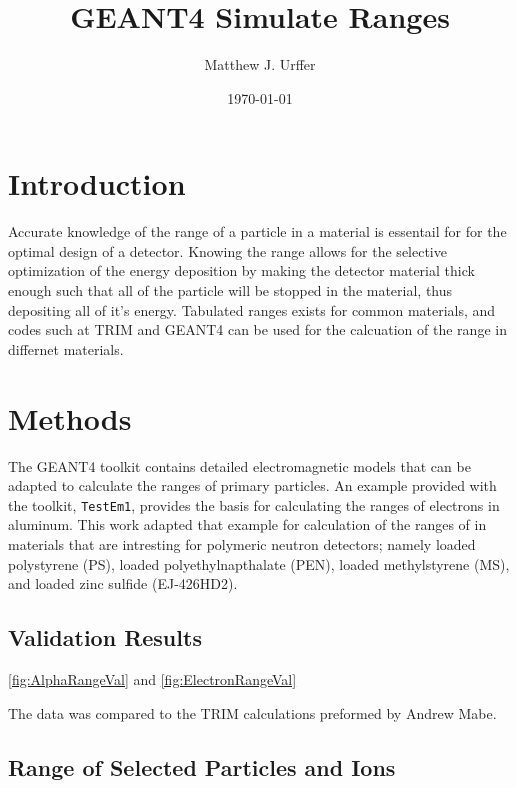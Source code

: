 \documentclass[draftcls,onecolumn]{IEEEtran}
\begin{document}
\title{GEANT4 Simulate Ranges}
\author{Matthew J. Urffer}
\date{\today}
\maketitle

\printnomenclature

\listoftodos
\tableofcontents
\listoffigures
\listoftables
\lstlistoflistings

\section{Introduction}
Accurate knowledge of the range of a particle in a material is essentail for for the optimal design of a detector.
Knowing the range allows for the selective optimization of the energy deposition by making the detector material thick enough such that all of the particle will be stopped in the material, thus depositing all of it's energy.
Tabulated ranges exists for common materials, and codes such at TRIM and GEANT4 can be used for the calcuation of the range in differnet materials\cite{berger_estar_2005}.

\section{Methods}
The GEANT4 toolkit contains detailed electromagnetic models that can be adapted to calculate the ranges of primary particles.
An example provided with the toolkit, \verb+TestEm1+, provides the basis for calculating the ranges of electrons in aluminum. 
This work adapted that example for calculation of the ranges of in materials that are intresting for polymeric neutron detectors; namely  loaded polystyrene (PS),  loaded polyethylnapthalate (PEN),  loaded methylstyrene (MS), and  loaded zinc sulfide (EJ-426HD2).


\subsection{Validation Results}
\label{sec:ValResults}
\autoref{fig:AlphaRangeVal} and \autoref{fig:ElectronRangeVal}

The data was compared to the TRIM calculations preformed by Andrew Mabe.
\subsection{Range of Selected Particles and Ions}
\label{sec:RangeResults}
\end{document}
